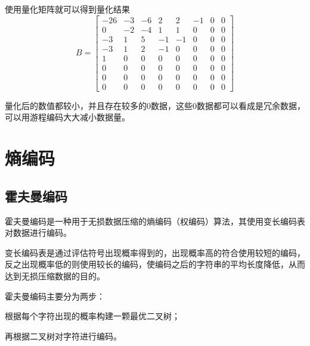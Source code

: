 使用量化矩阵就可以得到量化结果
\begin{equation}
    B=\begin{bmatrix}
    -26 & -3 & -6 & 2 & 2 & -1 & 0 & 0 \\
    0 & -2 & -4 & 1 & 1 & 0 & 0 & 0 \\
    -3 & 1 & 5 & -1 & -1 & 0 & 0 & 0 \\
    -3 & 1 & 2 & -1 & 0 & 0 & 0 & 0 \\
    1 & 0 & 0 & 0 & 0 & 0 & 0 & 0 \\
    0 & 0 & 0 & 0 & 0 & 0 & 0 & 0 \\
    0 & 0 & 0 & 0 & 0 & 0 & 0 & 0 \\
    0 & 0 & 0 & 0 & 0 & 0 & 0 & 0
    \end{bmatrix}
\end{equation}


量化后的数值都较小，并且存在较多的0数据，这些0数据都可以看成是冗余数据，可以用游程编码大大减小数据量。


\section{熵编码}
\subsection{霍夫曼编码}
霍夫曼编码是一种用于无损数据压缩的熵编码（权编码）算法，其使用变长编码表对数据进行编码。

变长编码表是通过评估符号出现概率得到的，出现概率高的符合使用较短的编码，反之出现概率低的则使用较长的编码，使编码之后的字符串的平均长度降低，从而达到无损压缩数据的目的。

霍夫曼编码主要分为两步：

根据每个字符出现的概率构建一颗最优二叉树；

再根据二叉树对字符进行编码。
